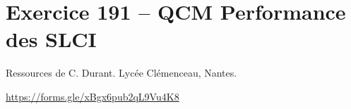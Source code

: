 \section*{Exercice 191 -- QCM Performance des SLCI}
\setcounter{exo}{0}
Ressources de C. Durant. Lycée Clémenceau, Nantes.
\begin{center}
\end{center}

\url{https://forms.gle/xBgx6pub2qL9Vu4K8}